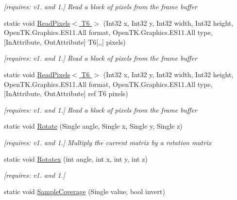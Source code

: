 \begin{DoxyCompactItemize}
\begin{DoxyCompactList}\small\item\em \mbox{[}requires\-: v1. and 1.\mbox{]} Read a block of pixels from the frame buffer \end{DoxyCompactList}\item 
static void \hyperlink{class_open_t_k_1_1_graphics_1_1_e_s11_1_1_g_l_aaf92e2e2b946c31d8b0f0a83d1b978e8}{Read\-Pixels$<$ T6 $>$} (Int32 x, Int32 y, Int32 width, Int32 height, Open\-T\-K.\-Graphics.\-E\-S11.\-All format, Open\-T\-K.\-Graphics.\-E\-S11.\-All type, \mbox{[}In\-Attribute, Out\-Attribute\mbox{]} T6\mbox{[},,\mbox{]} pixels)
\begin{DoxyCompactList}\small\item\em \mbox{[}requires\-: v1. and 1.\mbox{]} Read a block of pixels from the frame buffer \end{DoxyCompactList}\item 
static void \hyperlink{class_open_t_k_1_1_graphics_1_1_e_s11_1_1_g_l_a4eae3f36e9623cefc31109f6cf3d3734}{Read\-Pixels$<$ T6 $>$} (Int32 x, Int32 y, Int32 width, Int32 height, Open\-T\-K.\-Graphics.\-E\-S11.\-All format, Open\-T\-K.\-Graphics.\-E\-S11.\-All type, \mbox{[}In\-Attribute, Out\-Attribute\mbox{]} ref T6 pixels)
\begin{DoxyCompactList}\small\item\em \mbox{[}requires\-: v1. and 1.\mbox{]} Read a block of pixels from the frame buffer \end{DoxyCompactList}\item 
static void \hyperlink{class_open_t_k_1_1_graphics_1_1_e_s11_1_1_g_l_a6dff71b533921a96ec6c3d36a6abd153}{Rotate} (Single angle, Single x, Single y, Single z)
\begin{DoxyCompactList}\small\item\em \mbox{[}requires\-: v1. and 1.\mbox{]} Multiply the current matrix by a rotation matrix \end{DoxyCompactList}\item 
static void \hyperlink{class_open_t_k_1_1_graphics_1_1_e_s11_1_1_g_l_a57a7813bdceec3fc724ef9dfe67ae58b}{Rotatex} (int angle, int x, int y, int z)
\begin{DoxyCompactList}\small\item\em \mbox{[}requires\-: v1. and 1.\mbox{]}\end{DoxyCompactList}\item 
static void \hyperlink{class_open_t_k_1_1_graphics_1_1_e_s11_1_1_g_l_a88f01c77ef4829ed757786015476f29d}{Sample\-Coverage} (Single value, bool invert)

\end{DoxyCompactItemize}
